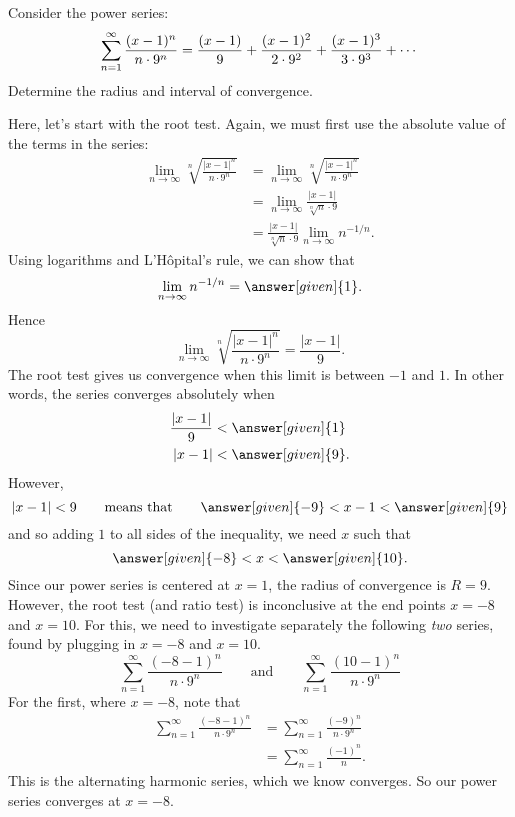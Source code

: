 \documentclass{ximera}
\begin{document}
\begin{example}
  Consider the power series:
  \[
  \sum_{n=1}^\infty \frac{(x-1)^n}{n \cdot 9^n} = \frac{(x-1)}{9} + \frac{(x-1)^2}{2\cdot 9^2} + \frac{(x-1)^3}{3\cdot 9^3} + \cdots\\
  \]
  Determine the radius and interval of convergence.
  \begin{explanation}
    Here, let's start with the root test. Again, we must first use the absolute value of the terms in the series:
    \begin{align*}
      \lim_{n\to\infty}\sqrt[n]{\frac{|x-1|^n}{n \cdot 9^n}} &= \lim_{n\to\infty}\sqrt[n]{\frac{|x-1|^n}{n \cdot 9^n}}\\
      &= \lim_{n\to\infty} \frac{|x-1|}{\sqrt[n]{n} \cdot 9}\\
      &= \frac{|x-1|}{\sqrt[n]{n} \cdot 9} \lim_{n\to\infty} n^{-1/n}.
    \end{align*}
    Using logarithms and L'H\^opital's rule, we can show that
    \[
    \lim_{n\to\infty} n^{-1/n} = \answer[given]{1}.
    \]
    Hence
    \[
    \lim_{n\to\infty}\sqrt[n]{\frac{|x-1|^n}{n \cdot 9^n}} = \frac{|x-1|}{9}.
    \]
    The root test gives us convergence when this limit is between $-1$ and $1$. 
    In other words, the series converges absolutely when
    \begin{align*}
    \frac{|x-1|}{9} &<\answer[given]{1}\\
    |x-1| &< \answer[given]{9}.
    \end{align*}
    However,
    \[
    |x-1| < 9 \qquad\text{means that}\qquad \answer[given]{-9} < x-1 < \answer[given]{9}
    \]
    and so adding $1$ to all sides of the inequality, we need $x$ such that
    \[
    \answer[given]{-8} < x < \answer[given]{10}.
    \]
    Since our power series is centered at $x=1$, the radius of
    convergence is $R=9$. However, the root test (and ratio test) is inconclusive 
    at the end points $x=-8$ and $x=10$. For this, we need to investigate separately
    the following \textit{two} series, found by plugging in $x = -8$ and $x=10$.
    \[
    \sum_{n=1}^\infty \frac{(-8-1)^n}{n \cdot 9^n}\qquad\text{and}\qquad \sum_{n=1}^\infty \frac{(10-1)^n}{n \cdot 9^n}
    \]
    For the first, where $x=-8$, note that
    \begin{align*}
      \sum_{n=1}^\infty \frac{(-8-1)^n}{n \cdot 9^n} &= \sum_{n=1}^\infty \frac{(-9)^n}{n \cdot 9^n}\\
      &= \sum_{n=1}^\infty \frac{(-1)^n}{n}.
    \end{align*}
    This is the alternating harmonic series, which we know converges. So our power series converges at $x= -8$.

\end{explanation}
\end{example}
\end{document}
